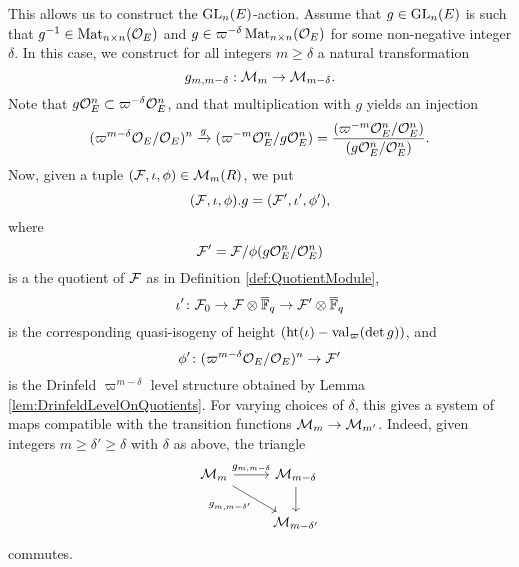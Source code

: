 \documentclass[../main.tex]{subfiles}
\begin{document}
This allows us to construct the $\operatorname{GL}_n(E)$-action. Assume that $g \in \operatorname{GL}_n(E)$ is such that $g^{-1} \in \operatorname{Mat}_{n\times
n}(\mathcal{O}_E)$ and $g \in \varpi^{-\delta} \operatorname{Mat}_{n \times n}(\mathcal{O}_E)$ for some non-negative
integer $\delta$. In this case, we construct for all integers $m \geq \delta$ a natural
transformation
\begin{equation*}
  g_{m, m-\delta}: \mathcal{M}_m \to \mathcal{M}_{m-\delta}.
\end{equation*}
Note that $g \mathcal{O}_E^n \subset \varpi^{-\delta} \mathcal{O}_E^n$, and that multiplication with
$g$ yields an injection
\begin{equation*}
  (\varpi^{m-\delta}\mathcal{O}_E/\mathcal{O}_E)^n \xrightarrow{g} (\varpi^{-m}\mathcal{O}_E^n/g\mathcal{O}_E^n) = 
  \frac{(\varpi^{-m} \mathcal{O}_E^n /\mathcal{O}_E^n)}{(g \mathcal{O}_E^n/\mathcal{O}_E^n)}.
\end{equation*}
Now, given a tuple $(\mathcal{F}, \iota, \phi) \in \mathcal{M}_m(R)$, we put $$(\mathcal{F}, \iota, \phi).g = (\mathcal{F}', \iota', \phi'),$$ where 
$$\mathcal{F}'= \mathcal{F}/\phi(g\mathcal{O}_E^n/\mathcal{O}_E^n)$$ 
is a the quotient of $\mathcal{F}$ as in Definition \ref{def:QuotientModule}, 
$$\iota'\colon \mathcal{F}_0 \to \mathcal{F} \otimes \overline {\mathbb{F}}_q \to \mathcal{F}' \otimes \overline {\mathbb{F}}_q$$ 
is the corresponding quasi-isogeny of height 
$(\textnormal{ht}(\iota) - \mathrm{val}_\varpi( \det g))$, and 
$$\phi'\colon (\varpi^{m-\delta}\mathcal{O}_E/\mathcal{O}_E)^n \to \mathcal{F}'$$ 
is the Drinfeld $\varpi^{m-\delta}$ level structure obtained by Lemma
\ref{lem:DrinfeldLevelOnQuotients}. 
For varying choices of $\delta$, this gives a system of maps compatible with the 
transition functions $\mathcal{M}_m \to \mathcal{M}_{m'}$. Indeed, given integers $m \geq \delta'
\geq \delta$ with $\delta$ as above, the triangle 
\begin{equation*}
\begin{tikzcd}[ampersand replacement=\&]
	{\cM_{m}} \& {\cM_{m-\delta}} \\
	\& {\cM_{m-\delta'}}
	\arrow["{g_{m,m-\delta}}", from=1-1, to=1-2]
	\arrow["{g_{m,m-\delta'}}"', from=1-1, to=2-2]
	\arrow[from=1-2, to=2-2]
\end{tikzcd}
\end{equation*}
commutes.
\end{document}
